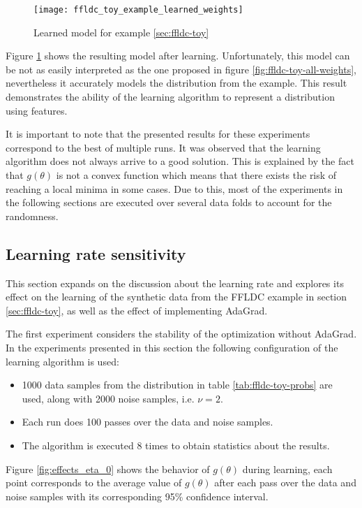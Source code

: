 \begin{figure}
  \centering
  \texttt{[image: ffldc\_toy\_example\_learned\_weights]}
  \caption{Learned model for example \ref{sec:ffldc-toy}}
  \label{fig:ffldc-toy-learned-weights}
\end{figure}

Figure \ref{fig:ffldc-toy-learned-weights} shows the resulting model after learning. Unfortunately, this model can be not as easily interpreted as the one proposed in figure \ref{fig:ffldc-toy-all-weights}, nevertheless it accurately models the distribution from the example. This result demonstrates the ability of the learning algorithm to represent a distribution using features.

It is important to note that the presented results for these experiments correspond to the best of multiple runs. It was observed that the learning algorithm does not always arrive to a good solution. This is explained by the fact that $g(\theta)$ is not a convex function which means that there exists the risk of reaching a local minima in some cases. Due to this, most of the experiments in the following sections are executed over several data folds to account for the randomness.

\subsection{Learning rate sensitivity}

This section expands on the discussion about the learning rate and explores its effect on the learning of the synthetic data from the FFLDC example in section \ref{sec:ffldc-toy}, as well as the effect of implementing AdaGrad.

The first experiment considers the stability of the optimization without AdaGrad. In the experiments presented in this section the following configuration of the learning algorithm is used:

\begin{itemize}
  \item 1000 data samples from the distribution in table \ref{tab:ffldc-toy-probs} are used, along with 2000 noise samples, i.e. $\nu = 2$.
  \item Each run does 100 passes over the data and noise samples.
  \item The algorithm is executed 8 times to obtain statistics about the results.
\end{itemize}

Figure \ref{fig:effects_eta_0} shows the behavior of $g(\theta)$ during learning, each point corresponds to the average value of $g(\theta)$ after each pass over the data and noise samples with its corresponding 95\% confidence interval.

